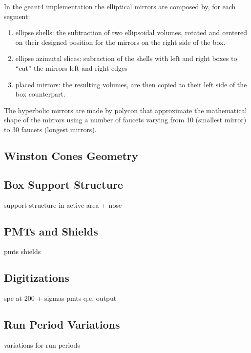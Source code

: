 In the geant4 implementation the elliptical mirrors are composed by, for each segment:

\begin{enumerate}
	\item ellipse shells: the subtraction of two ellipsoidal volumes, rotated and centered on their designed position for the mirrors on the right side of the box.
	\item ellipse azimutal slices: subraction of the shells with left and right boxes to ``cut'' the mirrors left and right edges
	\item placed mirrors: the resulting volumes,  are then copied to their left side of the box counterpart.
\end{enumerate}

The hyperbolic mirrors are made by polycon that approximate the mathematical shape of the mirrors using a number of faucets
varying from 10 (smallest mirror) to 30 faucets (longest mirrors).


\subsection{Winston Cones Geometry}


\subsection{Box Support Structure}

support structure in active area  + nose

\subsection{PMTs and Shields}

pmts shields

\subsection{Digitizations}

spe at 200 + sigmas
pmts q.e.
output

\subsection{Run Period Variations}


variations for run periods



